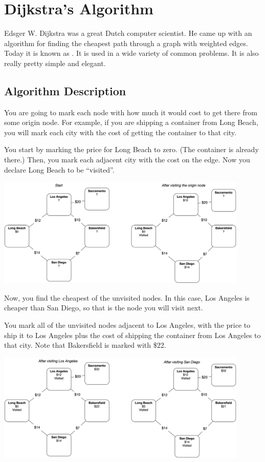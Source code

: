 \chapter{Dijkstra's Algorithm}

Edsger W. Dijkstra was a great Dutch computer scientist. He came up
with an algorithm for finding the cheapest path through a graph with
weighted edges. Today it is known as . It is used in a wide variety of common problems.  It is
also really pretty simple and elegant. 

\section{Algorithm Description}

You are going to mark each node with how much it would cost to get
there from some origin node.  For example, if you are shipping a
container from Long Beach, you will mark each city with the cost of
getting the container to that city.

You start by marking the price for Long Beach to zero.  (The container
is already there.)  Then, you mark each adjacent city with the cost on
the edge. Now you declare Long Beach to be ``visited''.

\includegraphics[width=0.9\textwidth]{step1.png}

Now, you find the cheapest of the unvisited nodes.  In this case, Los
Angeles is cheaper than San Diego, so that is the node you will visit
next.

You mark all of the unvisited nodes adjacent to Los Angeles, with the
price to ship it to Los Angeles plus the cost of shipping the
container from Los Angeles to that city. Note that Bakersfield is
marked with \$22.

\includegraphics[width=0.9\textwidth]{step2.png}

